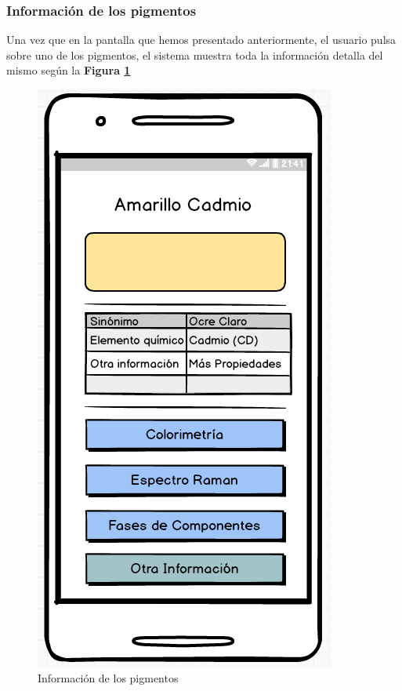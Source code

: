 \subsubsection*{Información de los pigmentos}

Una vez que en la pantalla que hemos presentado anteriormente, el usuario pulsa sobre uno de los pigmentos, el sistema muestra toda la información detalla del mismo según la \textbf{Figura \ref{fig:infoPigmentos}}

\newpage
\begin{multicols}{2}
    \begin{figure}[H]
    \centering
    \includegraphics[scale=0.6]{imagenes/diseno/inforPigmento.png}
    \caption{Información de los pigmentos}
    \label{fig:infoPigmentos}
    \end{figure}
    

\end{multicols}
